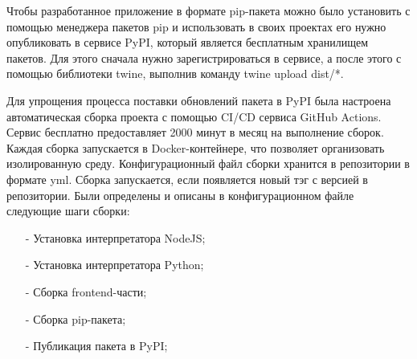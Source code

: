 Чтобы разработанное приложение в формате pip-пакета можно было установить с помощью менеджера пакетов pip и использовать в своих проектах его нужно опубликовать в сервисе PyPI, который является бесплатным хранилищем пакетов. Для этого сначала нужно зарегистрироваться в сервисе, а после этого с помощью библиотеки twine, выполнив команду twine upload dist/*. 


Для упрощения процесса поставки обновлений пакета в PyPI была настроена автоматическая сборка проекта с помощью CI/CD сервиса GitHub Actions. Сервис бесплатно предоставляет 2000 минут в месяц на выполнение сборок. Каждая сборка запускается в Docker-контейнере, что позволяет организовать изолированную среду. Конфигурационный файл сборки хранится в репозитории в формате yml. Сборка запускается, если появляется новый тэг с версией в репозитории. Были определены и описаны в конфигурационном файле следующие шаги сборки:
\begin{itemize}
	\item[-] Установка интерпретатора NodeJS;
	\item[-] Установка интерпретатора Python;
	\item[-] Сборка frontend-части;
	\item[-] Сборка pip-пакета;
	\item[-] Публикация пакета в PyPI;
\end{itemize}
